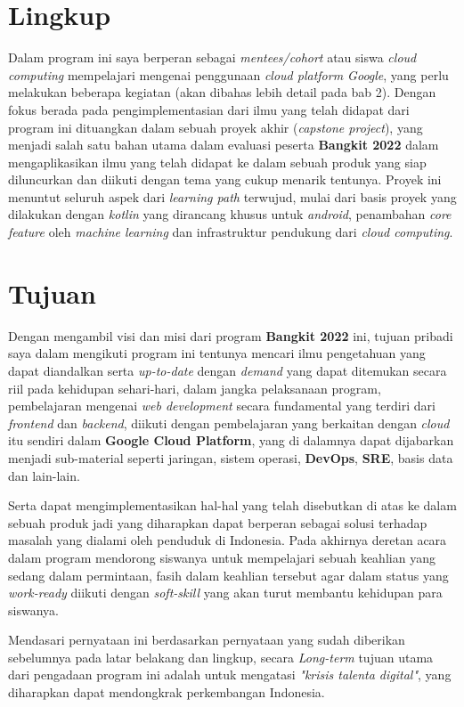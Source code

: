\section{Lingkup} \label{lingkup}

Dalam program ini saya berperan sebagai \textit{mentees/cohort} atau siswa \textit{cloud computing} mempelajari mengenai penggunaan \textit{cloud platform Google}, yang perlu melakukan beberapa kegiatan (akan dibahas lebih detail pada bab 2). Dengan fokus berada pada pengimplementasian dari ilmu yang telah didapat dari program ini dituangkan dalam sebuah proyek akhir (\textit{capstone project}), yang menjadi salah satu bahan utama dalam evaluasi peserta \textbf{Bangkit 2022} dalam mengaplikasikan ilmu yang telah didapat ke dalam sebuah produk yang siap diluncurkan dan diikuti dengan tema yang cukup menarik tentunya. Proyek ini menuntut seluruh aspek dari \textit{learning path} terwujud, mulai dari basis proyek yang dilakukan dengan \textit{kotlin} yang dirancang khusus untuk \textit{android}, penambahan \textit{core feature} oleh \textit{machine learning} dan infrastruktur pendukung dari \textit{cloud computing}.

\section{Tujuan}

Dengan mengambil visi dan misi dari program \textbf{Bangkit 2022} ini, tujuan pribadi saya dalam mengikuti program ini tentunya mencari ilmu pengetahuan yang dapat diandalkan serta \textit{up-to-date} dengan \textit{demand} yang dapat ditemukan secara riil pada kehidupan sehari-hari, dalam jangka pelaksanaan program, pembelajaran mengenai \textit{web development} secara fundamental yang terdiri dari \textit{frontend} dan \textit{backend}, diikuti dengan pembelajaran yang berkaitan dengan \textit{cloud} itu sendiri dalam \textbf{Google Cloud Platform}, yang di dalamnya dapat dijabarkan menjadi sub-material seperti jaringan, sistem operasi, \textbf{DevOps}, \textbf{SRE}, basis data dan lain-lain.

Serta dapat mengimplementasikan hal-hal yang telah disebutkan di atas ke dalam sebuah produk jadi yang diharapkan dapat berperan sebagai solusi terhadap masalah yang dialami oleh penduduk di Indonesia. Pada akhirnya deretan acara dalam program mendorong siswanya untuk mempelajari sebuah keahlian yang sedang dalam permintaan, fasih dalam keahlian tersebut agar dalam status yang \textit{work-ready} diikuti dengan \textit{soft-skill} yang akan turut membantu kehidupan para siswanya.

Mendasari pernyataan ini berdasarkan pernyataan yang sudah diberikan sebelumnya pada latar belakang dan lingkup, secara \textit{Long-term} tujuan utama dari pengadaan program ini adalah untuk mengatasi \textit{"krisis talenta digital"}, yang diharapkan dapat mendongkrak perkembangan Indonesia.